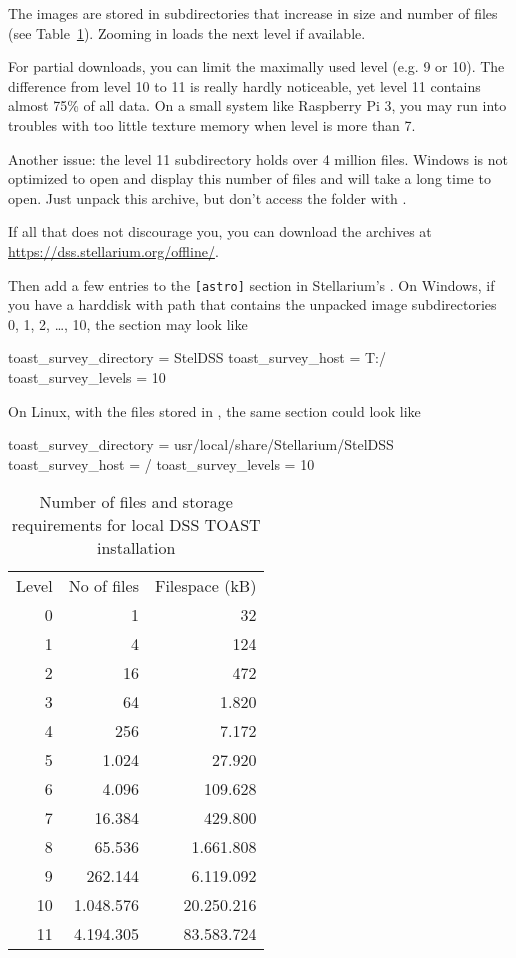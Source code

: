 The images are stored in subdirectories that increase in size and
number of files (see Table~\ref{tab:TOAST:levels}). Zooming in loads
the next level if available.

For partial downloads, you can limit the maximally used level (e.g. 9
or 10). The difference from level 10 to 11 is really hardly
noticeable, yet level 11 contains almost 75\% of all data. On a small
system like Raspberry Pi 3, you may run into troubles with too little
texture memory when level is more than 7.

Another issue: the level 11 subdirectory holds over 4 million
files. Windows  is not optimized to open and display
this number of files and will take a long time to open. Just unpack
this archive, but don't access the folder with .

If all that does not discourage you, you can download the archives at
\url{https://dss.stellarium.org/offline/}.

Then add a few entries to the \texttt{[astro]} section in
Stellarium's .  On Windows, if you have a harddisk
 with path  that contains the
unpacked image subdirectories 0, 1, 2, \ldots, 10, the section may look like
\begin{configfile}
[astro]
toast_survey_directory = StelDSS
toast_survey_host = T:/
toast_survey_levels = 10
\end{configfile}
On Linux, with the files stored in , the same section could look like
\begin{configfile}
[astro]
toast_survey_directory = usr/local/share/Stellarium/StelDSS
toast_survey_host = /
toast_survey_levels = 10
\end{configfile}

\begin{table}[htbp]
  \centering
\begin{tabular}{rrr}
Level & No of files & Filespace (kB)\\
0     &          1  &         32\\
1     &          4  &        124\\
2     &         16  &        472\\
3     &         64  &      1.820\\
4     &        256  &      7.172\\
5     &      1.024  &     27.920\\
6     &      4.096  &    109.628\\
7     &     16.384  &    429.800\\
8     &     65.536  &  1.661.808\\
9     &    262.144  &  6.119.092\\
10    &  1.048.576  & 20.250.216\\
11    &  4.194.305  & 83.583.724
\end{tabular}
\caption{Number of files and storage requirements for local DSS TOAST installation}
\label{tab:TOAST:levels}
\end{table}




